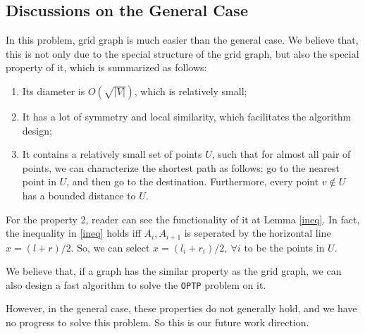 \documentclass[11pt]{article}
\theoremstyle{plain}
\begin{document}
\subsection{Discussions on the General Case}

In this problem, grid graph is much easier than the general case. We believe that, this is not only due to the special structure of the grid graph, but also the special property of it, which is summarized as follows:
\begin{enumerate}
    \item Its diameter is $O(\sqrt{|V|})$, which is relatively small;
    \item It has a lot of symmetry and local similarity, which facilitates the algorithm design;
    \item It contains a relatively small set of points $U$, such that for almost all pair of points, we can characterize the shortest path as follows: go to the nearest point in $U$, and then go to the destination. Furthermore, every point $v\not\in U$ has a bounded distance to $U$.
\end{enumerate}

For the property 2, reader can see the functionality of it at Lemma \ref{ineq}. In fact, the inequality in \ref{ineq} holds iff $A_i,A_{i+1}$ is seperated by the horizontal line $x=(l+r)/2$. So, we can select $x=(l_i+r_i)/2,\ \forall i$ to be the points in $U$.

We believe that, if a graph has the similar property as the grid graph, we can also design a fast algorithm to solve the \texttt{OPTP} problem on it.

However, in the general case, these properties do not generally hold, and we have no progress to solve this problem. So this is our future work direction.

\end{document}
